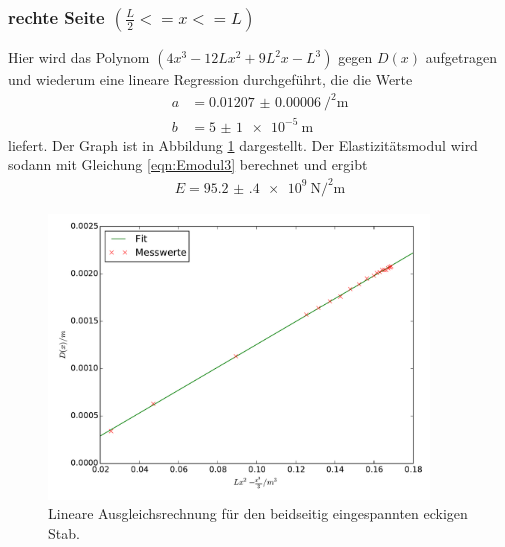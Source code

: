 \subsubsection{rechte Seite $(\frac{L}{2} <= x <= L)$}
Hier wird das Polynom $\left(4 x^3 - 12 L x^2 + 9 L^2 x - L^3\right)$ gegen $D(x)$
aufgetragen und wiederum eine lineare Regression durchgeführt, die die Werte
\begin{align*}
  a &= \SI{0.01207(6)}{\per\squared\meter}\\
  b &= \SI{5(1)e-5}{\meter}
\end{align*}
liefert. Der Graph ist in Abbildung \ref{fig:plot_beidseitig2} dargestellt. Der
Elastizitätsmodul wird sodann mit Gleichung \eqref{eqn:Emodul3} berechnet und ergibt
\begin{align*}
  E = \SI{95.2(4)e+9}{\newton\per\squared\meter}
\end{align*}
\begin{figure}
  \centering
  \includegraphics[width=0.9\textwidth]{stab1_beidseitig_rechts.pdf}
  \caption{Lineare Ausgleichsrechnung für den beidseitig eingespannten eckigen Stab.}
  \label{fig:plot_beidseitig2}
\end{figure}

